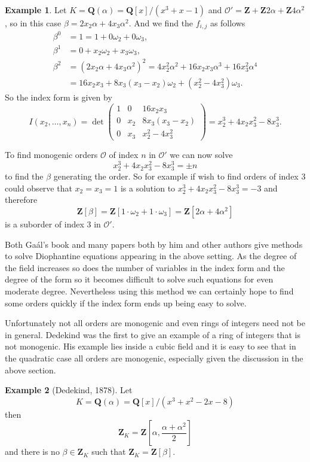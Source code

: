 \documentclass[12pt,a4paper,abstracton,bibtotoc]{scrreprt}
\theoremstyle{definition}
\newtheorem{ex}{Example}
\newcommand{\QQ}{\mathbf{Q}}
\newcommand{\ZZ}{\mathbf{Z}}
\renewcommand{\O}{\mathcal{O}}
\begin{document}
\begin{ex}
Let $K = \QQ(\alpha) = \QQ[x]/(x^3 + x - 1)$ and $\O' = \ZZ + \ZZ2\alpha + \ZZ4\alpha^2$, so in this case $\beta = 2x_2\alpha + 4x_3\alpha^2$.
And we find the $f_{i,j}$ as follows
\begin{align*}
\beta^0 &= 1 = 1 + 0\omega_2 + 0\omega_3,\\
\beta^1 &= 0 + x_2\omega_2 + x_3\omega_3,\\
\beta^2 &= (2x_2\alpha + 4x_3\alpha^2)^2 = 4x_2^2\alpha^2 + 16x_2x_3\alpha^3 + 16x_3^2\alpha^4 \\
&= 16x_2x_3 + 8x_3(x_3-x_2)\omega_2 + (x_2^2 - 4x_3^2)\omega_3.
\end{align*}
So the index form is given by
\[
I(x_2,\ldots,x_n) = \det\begin{pmatrix}
1 & 0   &  16x_2x_3\\
0 & x_2 & 8x_3(x_3-x_2)\\
0 & x_3 & x_2^2 -4x_3^2
\end{pmatrix}
= x_2^3 + 4x_2x_3^2 - 8x_3^3.
\]

To find monogenic orders $\O$ of index $n$ in $\O'$ we can now solve 
\[x_2^3 + 4x_2x_3^2 - 8x_3^3 = \pm n\]
to find the $\beta$ generating the order.
So for example if wish to find orders of index 3 could observe that $x_2 = x_3 = 1$ is a solution to $x_2^3 + 4x_2x_3^2 - 8x_3^3 = -3$ and therefore
\[
\ZZ[\beta] = \ZZ[1\cdot\omega_2 + 1\cdot \omega_3] = \ZZ[2\alpha + 4\alpha^2]
\]
is a suborder of index 3 in $\O'$.
\end{ex}

Both Ga\'al's book and many papers both by him and other authors give methods to solve Diophantine equations appearing in the above setting.
As the degree of the field increases so does the number of variables in the index form and the degree of the form so it becomes difficult to solve such equations for even moderate degree.
Nevertheless using this method we can certainly hope to find some orders quickly if the index form ends up being easy to solve.

Unfortunately not all orders are monogenic and even rings of integers need not be in general.
Dedekind was the first to give an example of a ring of integers that is not monogenic.
His example lies inside a cubic field and it is easy to see that in the quadratic case all orders are monogenic, especially given the discussion in the above section.

\begin{ex}[Dedekind, 1878]
Let 
\[
K = \QQ(\alpha) = \QQ[x]/(x^3 +x^2 -2x-8)
\]
then
\[
\ZZ_K=\ZZ\left[ \alpha,\frac{\alpha + \alpha^2}{2}\right]
\]
and there is no $\beta\in \ZZ_K$ such that $\ZZ_K=\ZZ[\beta]$.
\end{ex}
\end{document}
